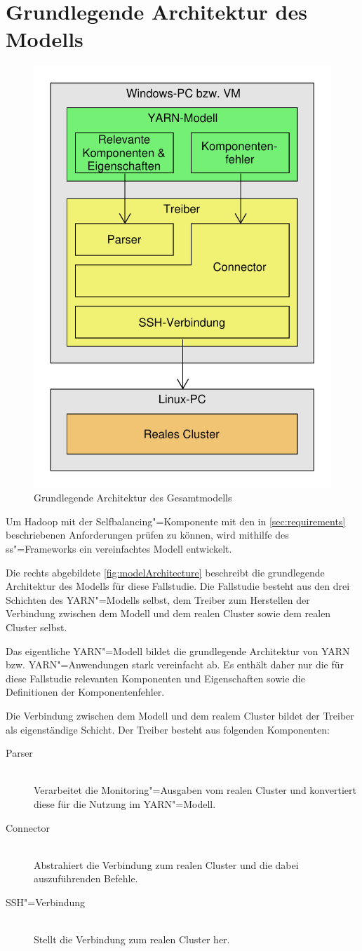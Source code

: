 \section{Grundlegende Architektur des Modells}
\label{sec:aufbauModel}

\begin{figure}
    \includegraphics[width=0.5\columnwidth]
    {./images/modelArchitecture.pdf}
    \caption{Grundlegende Architektur des Gesamtmodells}
    \label{fig:modelArchitecture}
\end{figure}

Um Hadoop mit der Selfbalancing"=Komponente mit den in \autoref{sec:requirements} beschriebenen Anforderungen prüfen zu können, wird mithilfe des \ac{ss}"=Frameworks ein vereinfachtes Modell entwickelt.

Die rechts abgebildete \autoref{fig:modelArchitecture} beschreibt die grundlegende Architektur des Modells für diese Fallstudie.
Die Fallstudie besteht aus den drei Schichten des YARN"=Modells selbst, dem Treiber zum Herstellen der Verbindung zwischen dem Modell und dem realen Cluster sowie dem realen Cluster selbst.

Das eigentliche YARN"=Modell bildet die grundlegende Architektur von YARN bzw. YARN"=Anwendungen stark vereinfacht ab.
Es enthält daher nur die für diese Fallstudie relevanten Komponenten und Eigenschaften sowie die Definitionen der Komponentenfehler.

Die Verbindung zwischen dem Modell und dem realem Cluster bildet der Treiber als eigenständige Schicht.
Der Treiber besteht aus folgenden Komponenten:

\begin{description}
    \item [Parser] \hfill \\
        Verarbeitet die Monitoring"=Ausgaben vom realen Cluster und konvertiert diese für die Nutzung im YARN"=Modell.
    \item [Connector] \hfill \\
        Abstrahiert die Verbindung zum realen Cluster und die dabei auszuführenden Befehle.
    \item [SSH"=Verbindung]  \hfill \\
        Stellt die Verbindung zum realen Cluster her.
\end{description}

